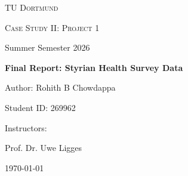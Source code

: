 \begin{titlepage}
	\centering
	{\scshape\LARGE TU Dortmund \par}
	\vspace{1cm}
	{\scshape\Large Case Study II: Project 1\par}
	\vspace{0.5cm}
	{\large Summer Semester 2026 \par}
	\vspace{2cm}
	{\huge\bfseries Final Report: Styrian Health Survey Data\par}
	\vspace{3cm}
	{\Large Author: Rohith B Chowdappa \par}
	\vspace{0.5 cm}
	{\large Student ID: 269962 \par}
	\vfill
	{\large Instructors: \par}
	{\large Prof. Dr. Uwe Ligges \par}
	\vspace{1cm}
	{\large \today\par}
\end{titlepage}
